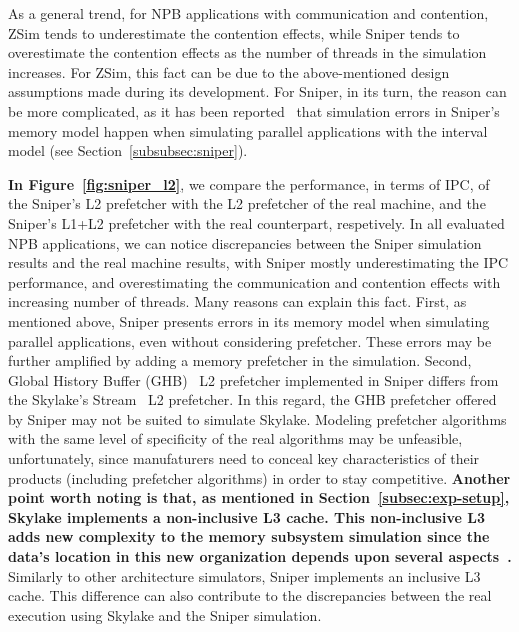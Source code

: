 \documentclass[AMA,final,STIX1COL]{WileyNJD-v2}
\newcommand\new[1]{{\color{red}\textbf{#1}}}
\begin{document}
As a general trend, for NPB applications with communication and contention, ZSim tends to underestimate the contention effects, while Sniper tends to overestimate the contention effects as the number of threads in the simulation increases.
For ZSim, this fact can be due to the above-mentioned design assumptions made during its development. 
For Sniper, in its turn, the reason can be more complicated, as it has been reported~\cite{carlson2014aeohmcm} that simulation errors in Sniper's memory model happen when simulating parallel applications with the interval model (see Section~\ref{subsubsec:sniper}). 





\textbf{In Figure~\ref{fig:sniper_l2}}, we compare the performance, in terms of IPC, of the Sniper's L2 prefetcher with the L2 prefetcher of the real machine, and the Sniper's L1+L2 prefetcher with the real counterpart, respetively.
In all evaluated NPB applications, we can notice discrepancies between the Sniper simulation results and the real machine results, with Sniper mostly underestimating the IPC performance, and overestimating the communication and contention effects with increasing number of threads.
Many reasons can explain this fact. 
First, as mentioned above, Sniper presents errors in its memory model when simulating parallel applications, even without considering prefetcher. 
These errors may be further amplified by adding a memory prefetcher in the simulation. 
Second, Global History Buffer (GHB)~\cite{nesbit2004data} L2 prefetcher implemented in Sniper differs from the Skylake's Stream~\cite{intelmanual} L2 prefetcher. 
In this regard, the GHB prefetcher offered by Sniper may not be suited to simulate Skylake. 
Modeling prefetcher algorithms with the same level of specificity of the real algorithms may be unfeasible, unfortunately, since manufaturers need to conceal key characteristics of their products (including prefetcher algorithms) in order to stay competitive.
\new{Another point worth noting is that, as mentioned in Section~\ref{subsec:exp-setup}, Skylake implements a non-inclusive L3 cache.
This non-inclusive L3 adds new complexity to the memory subsystem simulation since the data's location in this new organization depends upon several aspects~\cite{intelmanual}.}
Similarly to other architecture simulators, Sniper implements an inclusive L3 cache. This difference can also contribute to the discrepancies between the real execution using Skylake and the Sniper simulation.
\end{document}
